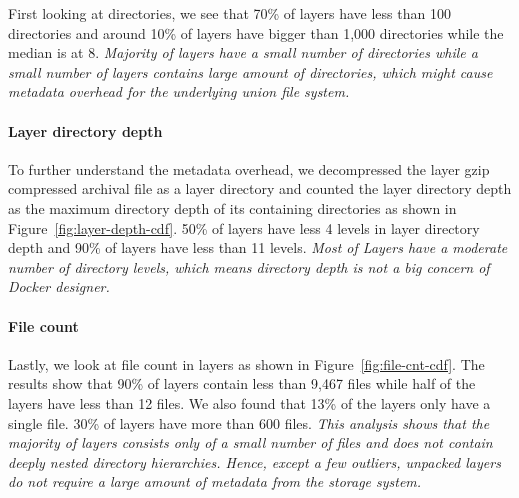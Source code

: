 First looking at directories, we see that
70\% of layers have less than 100 directories and around 10\% of layers have
bigger than 1,000 directories while the median is at 8.
%
\emph{Majority of layers have a small number of directories while a small
number of layers contains large amount of directories, which might cause
metadata overhead for the underlying union file system.}

\paragraph{Layer directory depth}

To further understand the metadata overhead, we decompressed the layer gzip
compressed archival file as a layer directory and counted the layer directory
depth as the maximum directory depth of its containing directories as shown in
Figure~\ref{fig:layer-depth-cdf}.
%
50\% of layers have less 4 levels in layer directory depth and 90\% of layers
have less than 11 levels.
%
\emph{Most of Layers have a moderate number of directory levels, which means
directory depth is not a big concern of Docker designer.}

\paragraph{File count}



Lastly, we look at file count in layers as shown in
Figure~\ref{fig:file-cnt-cdf}.
%
%
The results show that 90\% of layers contain less than 9,467 files while half
of the layers have less than 12 files.
%
We also found that 13\% of the layers only have a single file.
%
30\% of layers have more than 600 files.
%
\emph{This analysis shows that the majority of layers consists only of a small
number of files and does not contain deeply nested directory hierarchies.
%
Hence, except a few outliers, unpacked layers do not require a large amount of
metadata from the storage system.}

